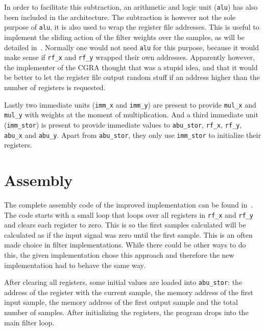 \documentclass[10pt,twocolumn]{article}
\begin{document}
In order to facilitate this subtraction, an arithmetic and logic unit
(\texttt{alu}) has also been included in the architecture. The
subtraction is however not the sole purpose of \texttt{alu}, it is
also used to wrap the register file addresses. This is useful to
implement the sliding action of the filter weights over the samples,
as will be detailed in~. Normally one would not
need \texttt{alu} for this purpose, because it would make sense if
\texttt{rf\_x} and \texttt{rf\_y} wrapped their own addresses.
Apparently however, the implementer of the CGRA thought that was a
stupid idea, and that it would be better to let the register file
output random stuff if an address higher than the number of registers
is requested.

Lastly two immediate units (\texttt{imm\_x} and \texttt{imm\_y}) are
present to provide \texttt{mul\_x} and \texttt{mul\_y} with weights at
the moment of multiplication. And a third immediate unit
(\texttt{imm\_stor}) is present to provide immediate values to
\texttt{abu\_stor}, \texttt{rf\_x}, \texttt{rf\_y}, \texttt{abu\_x}
and \texttt{abu\_y}. Apart from \texttt{abu\_stor}, they only use
\texttt{imm\_stor} to initialize their registers.


\section{Assembly}
\label{sec:assembly}

The complete assembly code of the improved implementation can be found
in~. The code starts with a small loop that loops
over all registers in \texttt{rf\_x} and \texttt{rf\_y} and clears
each register to zero. This is so the first samples calculated will be
calculated as if the input signal was zero until the first sample.
This is an often made choice in filter implementations. While there
could be other ways to do this, the given implementation chose this
approach and therefore the new implementation had to behave the same
way.

After clearing all registers, some initial values are loaded into
\texttt{abu\_stor}: the address of the register with the current
sample, the memory address of the first input sample, the memory
address of the first output sample and the total number of samples.
After initializing the registers, the program drops into the main
filter loop.
\end{document}
